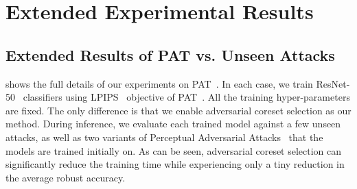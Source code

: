 \documentclass[runningheads]{llncs}
\begin{document}
\section{Extended Experimental Results}\label{ap:extended}

\subsection{Extended Results of PAT vs. Unseen Attacks}
 shows the full details of our experiments on PAT~\cite{laidlaw2021pat}.
In each case, we train ResNet-50~\cite{he2016deep} classifiers using LPIPS~\cite{zhang2018lpips} objective of PAT~\cite{laidlaw2021pat}.
All the training hyper-parameters are fixed.
The only difference is that we enable adversarial coreset selection as our method.
During inference, we evaluate each trained model against a few unseen attacks, as well as two variants of Perceptual Adversarial Attacks~\cite{laidlaw2021pat} that the models are trained initially on.
As can be seen, adversarial coreset selection can significantly reduce the training time while experiencing only a tiny reduction in the average robust accuracy.
\end{document}
